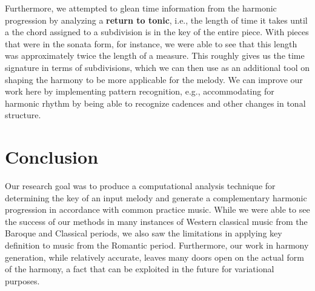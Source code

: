 \documentclass[11pt]{article}
\begin{document}
Furthermore, we attempted to glean time information from the harmonic progression by analyzing a {\bf return to tonic}, i.e., the length of time it takes until a the chord assigned to a subdivision is in the key of the entire piece. With pieces that were in the sonata form, for instance, we were able to see that this length was approximately twice the length of a measure. This roughly gives us the time signature in terms of subdivisions, which we can then use as an additional tool on shaping the harmony to be more applicable for the melody. We can improve our work here by implementing pattern recognition, e.g., accommodating for harmonic rhythm by being able to recognize cadences and other changes in tonal structure.

\section{Conclusion}
Our research goal was to produce a computational analysis technique for determining the key of an input melody and generate a complementary harmonic progression in accordance with common practice music. While we were able to see the success of our methods in many instances of Western classical music from the Baroque and Classical periods, we also saw the limitations in applying key definition to music from the Romantic period. Furthermore, our work in harmony generation, while relatively accurate, leaves many doors open on the actual form of the harmony, a fact that can be exploited in the future for variational purposes.

{}

\end{document}
